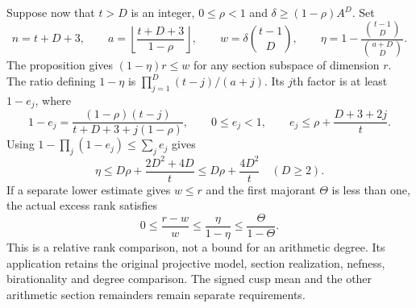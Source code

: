Suppose now that $t>D$ is an integer, $0\le\rho<1$ and
$\delta\ge(1-\rho)A^D$. Set
\[
 n=t+D+3,\qquad
 a=\left\lfloor\frac{t+D+3}{1-\rho}\right\rfloor,\qquad
 w=\delta\binom{t-1}{D},\qquad
 \eta=1-\frac{\binom{t-1}{D}}{\binom{a+D}{D}}.
\]
The proposition gives $(1-\eta)r\le w$ for any section subspace
of dimension $r$. The ratio defining $1-\eta$ is
$\prod_{j=1}^D(t-j)/(a+j)$. Its $j$th factor is at least $1-e_j$,
where
\[
 1-e_j=\frac{(1-\rho)(t-j)}{t+D+3+j(1-\rho)},\qquad
 0\le e_j<1,\qquad
 e_j\le\rho+\frac{D+3+2j}{t}.
\]
Using $1-\prod_j(1-e_j)\le\sum_j e_j$ gives
\[
 \boxed{\eta\le D\rho+\frac{2D^2+4D}{t}
               \le D\rho+\frac{4D^2}{t}\quad(D\ge2).}
\]
If a separate lower estimate gives $w\le r$ and the first majorant
$\Theta$ is less than one, the actual excess rank satisfies
\[
             0\le\frac{r-w}{w}\le\frac{\eta}{1-\eta}
                                  \le\frac{\Theta}{1-\Theta}.
\]
This is a relative rank comparison, not a bound for an arithmetic
degree. Its application retains the original projective model,
section realization, nefness, birationality and degree comparison.
The signed cusp mean and the other arithmetic section remainders
remain separate requirements.
